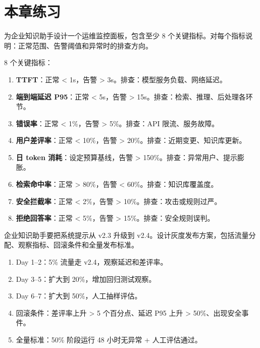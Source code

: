 \section{本章练习}
\begin{exercise}[设计监控面板]
为企业知识助手设计一个运维监控面板，包含至少 8 个关键指标。对每个指标说明：正常范围、告警阈值和异常时的排查方向。
\end{exercise}

\begin{solution}
8 个关键指标：
\begin{enumerate}
  \item \textbf{TTFT}：正常 < 1s，告警 > 3s。排查：模型服务负载、网络延迟。
  \item \textbf{端到端延迟 P95}：正常 < 5s，告警 > 15s。排查：检索、推理、后处理各环节。
  \item \textbf{错误率}：正常 < 1\%，告警 > 5\%。排查：API 限流、服务故障。
  \item \textbf{用户差评率}：正常 < 10\%，告警 > 20\%。排查：近期变更、知识库更新。
  \item \textbf{日 token 消耗}：设定预算基线，告警 > 150\%。排查：异常用户、提示膨胀。
  \item \textbf{检索命中率}：正常 > 80\%，告警 < 60\%。排查：知识库覆盖度。
  \item \textbf{安全拦截率}：正常 < 2\%，告警 > 10\%。排查：攻击或规则过严。
  \item \textbf{拒绝回答率}：正常 < 5\%，告警 > 15\%。排查：安全规则误判。
\end{enumerate}
\end{solution}

\begin{exercise}[灰度发布方案]
企业知识助手要把系统提示从 v2.3 升级到 v2.4。设计灰度发布方案，包括流量分配、观察指标、回滚条件和全量发布标准。
\end{exercise}

\begin{solution}
\begin{enumerate}
  \item Day 1--2：5\% 流量走 v2.4，观察延迟和差评率。
  \item Day 3--5：扩大到 20\%，增加回归测试观察。
  \item Day 6--7：扩大到 50\%，人工抽样评估。
  \item 回滚条件：差评率上升 > 5 个百分点、延迟 P95 上升 > 50\%、出现安全事件。
  \item 全量标准：50\% 阶段运行 48 小时无异常 + 人工评估通过。
\end{enumerate}
\end{solution}

